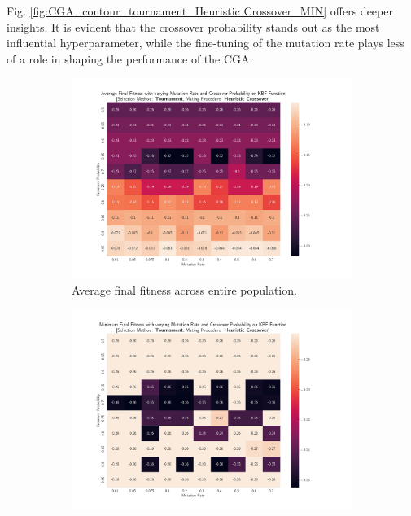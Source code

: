 \documentclass[10pt]{article}
\begin{document}
\begin{multicols}{2}
\columnbreak

Fig. \ref{fig:CGA_contour_tournament_Heuristic Crossover_MIN} offers deeper insights. It is evident that the crossover probability stands out as the most influential hyperparameter, while the fine-tuning of the mutation rate plays less of a role in shaping the performance of the CGA. 

\begin{figure}[H]
    \centering
    \begin{subfigure}{0.48\textwidth}
        \includegraphics[width=\textwidth]{../figures/Permanent Images/AVGContour_Tournament_Heuristic Crossover.png}
        \caption{Average final fitness across entire population.}
        \label{fig:CGA_contour_tournament_Heuristic Crossover_AVG}
    \end{subfigure}
    \begin{subfigure}{0.48\textwidth}
        \includegraphics[width=\textwidth]{../figures/Permanent Images/MINContour_Tournament_Heuristic Crossover.png}

\end{subfigure}
\end{figure}
\end{multicols}
\end{document}

